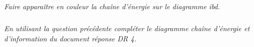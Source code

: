 \documentclass[11pt,oneside]{article}
\begin{document}
\subparagraph{}
\textit{Faire apparaître en couleur la chaîne d'énergie sur le diagramme ibd.}


\subparagraph{}
\textit{En utilisant la question précédente compléter le diagramme chaîne d'énergie et d'information du document réponse DR 4.}

\end{document}
